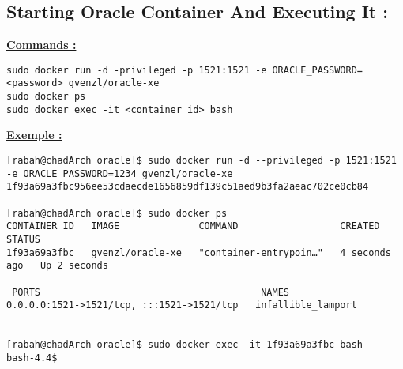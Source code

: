 \documentclass{article}
\begin{document}
\subsection{Starting Oracle Container And Executing It :}
\begin{tcolorbox}

\textbf{\underline{Commands :}}

\begin{verbatim}
sudo docker run -d -privileged -p 1521:1521 -e ORACLE_PASSWORD=<password> gvenzl/oracle-xe
sudo docker ps
sudo docker exec -it <container_id> bash
\end{verbatim}

\textbf{\underline{Exemple :}}

\begin{verbatim}
[rabah@chadArch oracle]$ sudo docker run -d --privileged -p 1521:1521 -e ORACLE_PASSWORD=1234 gvenzl/oracle-xe
1f93a69a3fbc956ee53cdaecde1656859df139c51aed9b3fa2aeac702ce0cb84

[rabah@chadArch oracle]$ sudo docker ps
CONTAINER ID   IMAGE              COMMAND                  CREATED         STATUS         
1f93a69a3fbc   gvenzl/oracle-xe   "container-entrypoin…"   4 seconds ago   Up 2 seconds 

 PORTS                                       NAMES
0.0.0.0:1521->1521/tcp, :::1521->1521/tcp   infallible_lamport


[rabah@chadArch oracle]$ sudo docker exec -it 1f93a69a3fbc bash
bash-4.4$
\end{verbatim}
\end{tcolorbox}
\end{document}
